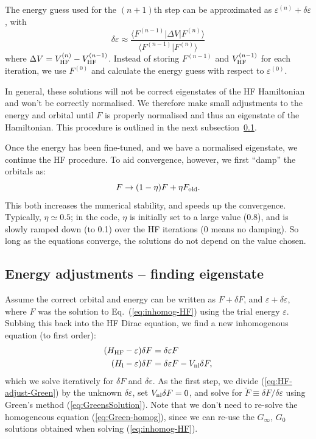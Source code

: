 \documentclass[10pt,twocolumn,a4paper]{article}%
\newcommand{\bra}[1]{\ensuremath{\langle #1|}}	%
\newcommand{\ket}[1]{\ensuremath{|#1\rangle}}	%
\newcommand{\braket}[1]{\ensuremath{\langle #1\rangle}}	%
\newcommand{\be}{\begin{equation}}
\newcommand{\ee}{\end{equation}}
\def\en{\ensuremath{\varepsilon}}
\begin{document}
The energy guess used for the $(n+1)$th step can be approximated as $\en^{(n)}+\delta\en$, with
\be
\delta\en \approx  \frac{\bra{F^{(n-1)}} \Delta V \ket{F^{(n)}}}{\braket{F^{(n-1)}|F^{(n)}}}
\ee
where $\Delta V = V_{\rm HF}^{(n)} - V_{\rm HF}^{(n-1)}$.
Instead of storing $F^{(n-1)}$ and $V_{\rm HF}^{(n-1)}$ for each iteration, we use $F^{(0)}$ and calculate the energy guess with respect to $\en^{(0)}$.

In general, these solutions will not be correct eigenstates of the HF Hamiltonian and won't be correctly normalised.
We therefore make small adjustments to the energy and orbital until $F$ is properly normalised and thus an eigenstate of the Hamiltonian. 
This procedure is outlined in the next subsection~\ref{sec:hf-adjustEn}.

Once the energy has been fine-tuned, and we have a normalised eigenstate, we continue the HF procedure.
To aid convergence, however, we first ``damp'' the orbitals as:
\be
F \to (1-\eta)F+ \eta F_{\rm old}.
\ee
This both increases the numerical stability, and speeds up the convergence. %
Typically, $\eta\simeq0.5$; in the code, $\eta$ is initially set to a large value (0.8), and is slowly ramped down (to 0.1) over the HF iterations (0 means no damping).
So long as the equations converge, the solutions do not depend on the value chosen.










\subsection{Energy adjustments -- finding eigenstate}\label{sec:hf-adjustEn}




Assume the correct orbital and energy can be written as
$F +  \delta F$, and
$\en + \delta\en $,
where $F$ was the solution to Eq.~(\ref{eq:inhomog-HF}) using the trial energy $\en$.
Subbing this back into the HF Dirac equation, we find a new inhomogenous equation (to first order):
\begin{align}
(H_{\rm HF} - \en) \delta F &=  \delta\en F  \\
(H_{\rm l} - \en) \delta F &=  \delta\en F  - V_{\rm nl} \delta F,  \label{eq:HF-adjust-Green}
\end{align}
which we solve iteratively for $\delta F$ and $\delta \en$.
As the first step, we divide (\ref{eq:HF-adjust-Green}) by the unknown $\delta\en$, set $V_{\rm nl} \delta F=0$, and solve for $\tilde F\equiv\delta F/\delta\en$ using Green's method (\ref{eq:GreensSolution}).
Note that we don't need to re-solve the homogeneous equation (\ref{eq:Green-homog}), since we can re-use the $G_\infty$, $G_0$
solutions obtained when solving (\ref{eq:inhomog-HF}).
\end{document}
